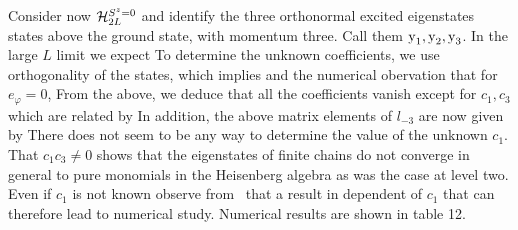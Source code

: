 Consider now  ${\cal H}_{2L}^{S^z=0}$ and identify the three orthonormal
excited
eigenstates states above the ground state, with momentum three. Call them
$\hbox{y}_{1},\hbox{y}_{2},\hbox{y}_{3}$.
In the large $L$ limit we expect
%
\eqn{}
%
To determine  the  unknown coefficients, we use orthogonality of the
 states, which implies
%
\eqn{}
%
and the numerical obervation that for $e_{\varphi}=0$,
%
\eqn{}
%
{}From the above, we deduce that all the coefficients
 vanish except for $c_1,c_3$ which are related by
%
\eqn{}
%
In addition, the above matrix elements of $l_{-3}$ are now given by
%
\eqn{}
%
There does not seem to be any way to determine the value of the unknown $c_1$.
 That
$c_1c_3\neq 0$ shows that the eigenstates of finite chains do not  converge in
general
to pure monomials in the Heisenberg algebra  as was the case at level two.
Even if $c_1$ is not known observe from \wmv\ that
%
\eqn{}
%
a result in dependent of $c_1$ that can therefore lead to numerical study.
Numerical
results are shown in table 12.

